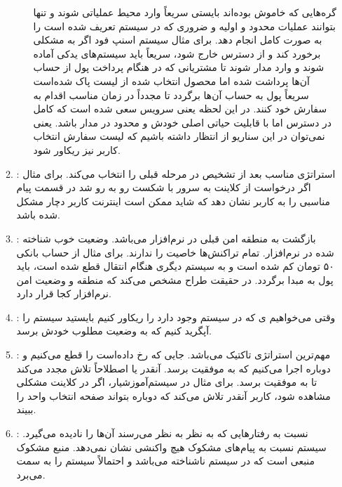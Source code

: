 \begin{enumerate}
\begin{enumerate}
\begin{enumerate}
            گره‌هایی که خاموش بوده‌اند بایستی سریعاً وارد محیط عملیاتی شوند و
            تنها بتوانند عملیات محدود و اولیه و ضروری که در سیستم تعریف شده است
            را به صورت کامل انجام دهد. برای مثال سیستم اسنپ فود اگر به مشکلی
            برخورد کند و از دسترس خارج شود، سریعاً باید سیستم‌های یدکی آماده
            شوند و وارد مدار شوند تا مشتریانی که در هنگام پرداخت پول از حساب
            آن‌ها پرداشت شده اما محصول انتخاب شده از لیست پاک شده‌است سریعاً پول
            به حساب آن‌ها برگردد تا مجدداً در زمان مناسب اقدام به سفارش خود
            کنند. در این لحظه یعنی سرویس  سعی شده است که کامل در
            دسترس اما با قابلیت حیاتی اصلی خودش و محدود در مدار باشد. یعنی
            نمی‌توان در این سناریو از  انتظار داشته باشیم که لیست
            سفارش انتخاب کاربر نیز ریکاور شود.
        \end{enumerate}
        \item {}: استراتژی مناسب بعد از تشخیص
         در مرحله قبلی را انتخاب می‌کند. برای مثال اگر درخواست از
        کلاینت به سرور با شکست رو به رو شد در قسمت  پیام مناسبی را
        به کاربر نشان دهد که شاید ممکن است اینترنت کاربر دچار مشکل شده باشد.
        \item {}: بازگشت به منطقه امن قبلی در نرم‌افزار می‌باشد.
        وضعیت خوب شناخته شده در نرم‌افزار. تمام تراکنش‌ها خاصیت  را
        ندارند. برای مثال از حساب بانکی ۵۰ تومان کم شده است و به سیستم دیگری
        هنگام انتقال قطع شده است، باید پول به مبدا برگردد. در حقیقت طراح مشخص
        می‌کند که منطقه و وضعیت امن نرم‌افزار کجا قرار دارد.
        \item {}: وقتی می‌خواهیم ی که در سیستم وجود
        دارد را ریکاور کنیم بایستید سیستم را آپگرید کنیم که به وضعیت مطلوب خودش
        برسد.
        \item {}: مهم‌ترین استراتژی تاکتیک 
        می‌باشد. جایی که  رخ داده‌است را قطع می‌کنیم و دوباره اجرا
        می‌کنیم که به موفقیت برسد. آنقدر  یا اصطلاحاً تلاش مجدد می‌کند
        تا به موفقیت برسد. برای مثال در سیستم‌آموزشیار، اگر در کلاینت مشکلی
        مشاهده شود، کاربر آنقدر تلاش می‌کند که دوباره بتواند صفحه انتخاب واحد را
        ببیند.
        \item {}: نسبت به رفتار‌هایی که به نظر
         به نظر می‌رسند آن‌ها را نادیده می‌گیرد. سیستم نسبت به
        پیام‌های مشکوک هیچ واکنشی نشان نمی‌دهد. منبع مشکوک منبعی است که در سیستم
        ناشناخته می‌باشد و احتمالاً سیستم را به سمت  می‌برد.

\end{enumerate}
\end{enumerate}
